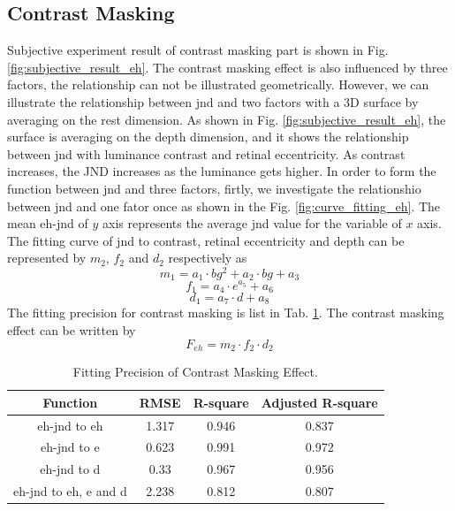 \documentclass[journal]{IEEEtran}
\begin{document}
\subsection{Contrast Masking}
Subjective experiment result of contrast masking part is shown in Fig. \ref{fig:subjective_result_eh}. The contrast masking effect is also influenced by three factors, the relationship can not be illustrated geometrically. However, we can illustrate the relationship between jnd and two factors with a 3D surface by averaging on the rest dimension. As shown in Fig. \ref{fig:subjective_result_eh}, the surface is averaging on the depth dimension, and it shows the relationship between jnd with luminance contrast and retinal eccentricity. As contrast increases, the JND increases as the luminance gets higher. In order to form the function between jnd and three factors, firtly, we investigate the relationshio between jnd and one fator once as shown in the Fig. \ref{fig:curve_fitting_eh}. The mean eh-jnd of $y$ axis represents the average jnd value for the variable of $x$ axis. The fitting curve of jnd to contrast, retinal eccentricity and depth can be represented by $m_2$, $f_2$ and $d_2$ respectively as
\begin{equation}
m_1=a_1\cdot bg^2+a_2\cdot bg+a_3
\end{equation}
\begin{equation}
f_1=a_4\cdot e^{a_5}+a_6
\end{equation}
\begin{equation}
d_1=a_7\cdot d+a_8
\end{equation}
The fitting precision for contrast masking is list in Tab. \ref{tab:fit_precition_eh}. The contrast masking effect can be written by
\begin{equation}
F_{eh}=m_2\cdot f_2 \cdot d_2
\end{equation}
\begin{table}[htbp] 
	\centering
	\caption{Fitting Precision of Contrast Masking Effect.}
	\begin{tabular}{|c|c|c|c|}
		\hline
		Function & RMSE & R-square & Adjusted R-square \\
		\hline
		eh-jnd to eh & 1.317 & 0.946 & 0.837 \\
		\hline
		eh-jnd to e & 0.623 & 0.991 & 0.972 \\
		\hline
		eh-jnd to d & 0.33 & 0.967 & 0.956 \\
		\hline
		eh-jnd to eh, e and d & 2.238 & 0.812 & 0.807 \\
		\hline
	\end{tabular}%
	\label{tab:fit_precition_eh}%
\end{table}%
\end{document}
